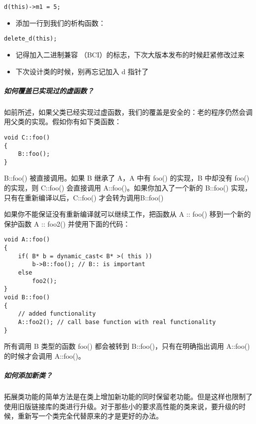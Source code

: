 \begin{lstlisting}
d(this)->m1 = 5;
\end{lstlisting}

\begin{itemize}

\item
  添加一行到我们的析构函数：
\end{itemize}

\begin{lstlisting}
delete_d(this);
\end{lstlisting}

\begin{itemize}

\item
  记得加入二进制兼容 （BCI）的标志，下次大版本发布的时候赶紧修改过来
\item
  下次设计类的时候，别再忘记加入 d 指针了
\end{itemize}

\subparagraph{如何覆盖已实现过的虚函数？}\label{ux5982ux4f55ux8986ux76d6ux5df2ux5b9eux73b0ux8fc7ux7684ux865aux51fdux6570}

如前所述，如果父类已经实现过虚函数，我们的覆盖是安全的：老的程序仍然会调用父类的实现。假如你有如下类函数：

\begin{lstlisting}
void C::foo()
{
    B::foo();
}
\end{lstlisting}

B::foo() 被直接调用。如果 B 继承了 A，A 中有 foo() 的实现，B 中却没有
foo() 的实现，则 C::foo() 会直接调用 A::foo()。如果你加入了一个新的
B::foo() 实现，只有在重新编译以后，C::foo() 才会转为调用B::foo()

如果你不能保证没有重新编译就可以继续工作，把函数从 A :: foo()
移到一个新的保护函数 A :: foo2() 并使用下面的代码：

\begin{lstlisting}
void A::foo()
{
    if( B* b = dynamic_cast< B* >( this ))
        b->B::foo(); // B:: is important
    else
        foo2();
}
void B::foo()
{
    // added functionality
    A::foo2(); // call base function with real functionality
}
\end{lstlisting}

所有调用 B 类型的函数 foo() 都会被转到 B::foo()，只有在明确指出调用
A::foo() 的时候才会调用 A::foo()。

\subparagraph{如何添加新类？}\label{ux5982ux4f55ux6dfbux52a0ux65b0ux7c7b}

拓展类功能的简单方法是在类上增加新功能的同时保留老功能。但是这样也限制了使用旧版链接库的类进行升级。对于那些小的要求高性能的类来说，要升级的时候，重新写一个类完全代替原来的才是更好的办法。

